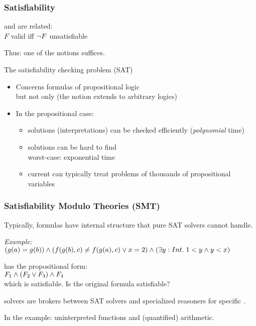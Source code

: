 \documentclass{beamer}
\begin{document}
\begin{frame}[fragile]\frametitle{Satisfiability}

   and  are related:\\
  $F$ valid \hspace{5mm} iff \hspace{5mm} $\neg F$ unsatisfiable

  \vspace{5mm}
  Thus: one of the notions suffices.
  \vspace{5mm}
  
  The satisfiability checking problem (SAT)
  \begin{itemize}
  \item Concerns formulas of propositional logic\\
    but not only (the notion extends to arbitrary logics)
  \item In the propositional case:
    \begin{itemize}
    \item solutions (interpretations) can be checked efficiently
      (\emph{polynomial} time)
    \item solutions can be hard to find\\
      worst-case: exponential time
    \item current  can typically treat problems of thousands of
      propositional variables
    \end{itemize}
  \end{itemize}

\end{frame}

\begin{frame}[fragile]\frametitle{Satisfiability Modulo Theories (SMT)}

Typically, formulas have internal structure that pure SAT solvers cannot
handle.

\vspace{5mm}
\emph{Example:}\\
$(g(a) = g(b)) \wedge (f(g(b), c) \neq f(g(a), c) \vee x = 2) \wedge (\exists y:Int.\; 1 < y \wedge y < x)$

has the propositional form:\\
$F_1 \wedge (F_2 \vee F_3) \wedge F_4$\\
which is satisfiable. Is the original formula satisfiable?

\vspace{5mm}
 solvers are brokers between SAT solvers and specialized reasoners
for specific .

\vspace{5mm}
In the example: uninterpreted functions and (quantified) arithmetic.


\end{frame}
\end{document}

